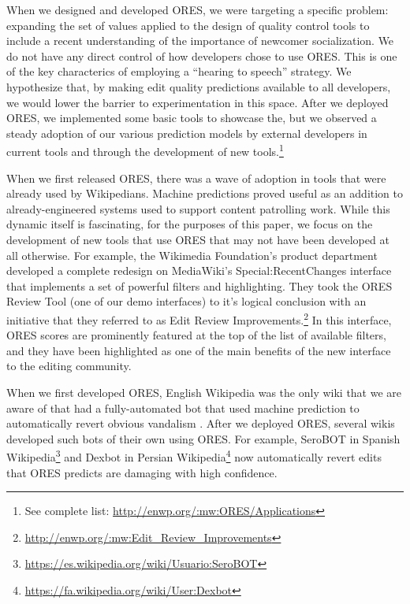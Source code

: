 When we designed and developed ORES, we were targeting a specific problem: expanding the set of values applied to the design of quality control tools to include a recent understanding of the importance of newcomer socialization.  We do not have any direct control of how developers chose to use ORES.  This is one of the key characterics of employing a ``hearing to speech'' strategy.  We hypothesize that, by making edit quality predictions available to all developers, we would lower the barrier to experimentation in this space.   After we deployed ORES, we implemented some basic tools to showcase the, but we observed a steady adoption of our various prediction models by external developers in current tools and through the development of new tools.\footnote{See complete list: \url{http://enwp.org/:mw:ORES/Applications}}

When we first released ORES, there was a wave of adoption in tools that were already used by Wikipedians.  Machine predictions proved useful as an addition to already-engineered systems used to support content patrolling work.  While this dynamic itself is fascinating, for the purposes of this paper, we focus on the development of new tools that use ORES that may not have been developed at all otherwise.  For example, the Wikimedia Foundation's product department developed a complete redesign on MediaWiki's Special:RecentChanges interface that implements a set of powerful filters and highlighting.  They took the ORES Review Tool (one of our demo interfaces) to it's logical conclusion with an initiative that they referred to as Edit Review Improvements.\footnote{\url{http://enwp.org/:mw:Edit_Review_Improvements}}  In this interface, ORES scores are prominently featured at the top of the list of available filters, and they have been highlighted as one of the main benefits of the new interface to the editing community.

When we first developed ORES, English Wikipedia was the only wiki that we are aware of that had a fully-automated bot that used machine prediction to automatically revert obvious vandalism \cite{carter2008cluebot}.  After we deployed ORES, several wikis developed such bots of their own using ORES.  For example, SeroBOT in Spanish Wikipedia\footnote{\url{https://es.wikipedia.org/wiki/Usuario:SeroBOT}} and Dexbot in Persian Wikipedia\footnote{\url{https://fa.wikipedia.org/wiki/User:Dexbot}} now automatically revert edits that ORES predicts are damaging with high confidence. 

